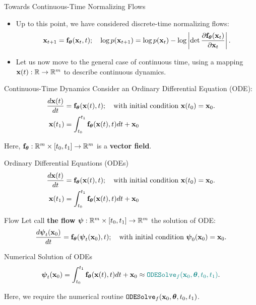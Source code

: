 \documentclass{beamer}
\renewcommand{\eqpause}{}
\renewcommand{\nextonslide}[1]{#1}
\begin{document}
\begin{frame}{Towards Continuous-Time Normalizing Flows}
	\begin{itemize}
		\item Up to this point, we have considered discrete-time normalizing flows:
		\vspace{-0.3cm}
		 \[
		 	 \mathbf{x}_{t+1} = \mathbf{f}_{\boldsymbol{\theta}}(\mathbf{x}_t, t); \quad \log p(\mathbf{x}_{t+1}) = \log p(\mathbf{x}_{t}) - \log \left| \det \frac{\partial \mathbf{f}_{\boldsymbol{\theta}}(\mathbf{x}_t)}{\partial \mathbf{x}_{t}} \right| .
		 \]
		\item Let us now move to the general case of continuous time, using a mapping $\mathbf{x}(t): \mathbb{R} \rightarrow \mathbb{R}^m$ to describe continuous dynamics.
	\end{itemize}
	\eqpause
	\begin{block}{Continuous-Time Dynamics}
		Consider an Ordinary Differential Equation (ODE):
		\vspace{-0.3cm}
		\begin{align*}
		   \frac{d \bx(t)}{dt} &= \bff_{\btheta}(\bx(t), t); \quad \text{with initial condition }\bx(t_0) = \bx_0. \\
		   \nextonslide{
		   \bx(t_1) &= \int^{t_1}_{t_0} \bff_{\btheta}(\bx(t), t) d t  + \bx_0
		   }
		\end{align*}
		\vspace{-0.6cm}
	\end{block}
	Here, $\mathbf{f}_{\boldsymbol{\theta}}: \mathbb{R}^m \times [t_0, t_1] \rightarrow \mathbb{R}^m$ is a \textbf{vector field}.
\end{frame}
\begin{frame}{Ordinary Differential Equations (ODEs)}
	\begin{align*}
		\frac{d \mathbf{x}(t)}{dt} &= \mathbf{f}_{\boldsymbol{\theta}}(\mathbf{x}(t), t); \quad \text{with initial condition }\mathbf{x}(t_0) = \mathbf{x}_0. \\
		\mathbf{x}(t_1) &= \int^{t_1}_{t_0} \mathbf{f}_{\boldsymbol{\theta}}(\mathbf{x}(t), t) d t  + \mathbf{x}_0
	\end{align*}
	\vspace{-0.6cm}
	\begin{block}{Flow}
		Let call \textbf{the flow} $\boldsymbol{\psi}: \mathbb{R}^m \times [t_0, t_1] \rightarrow \mathbb{R}^m$ the solution of ODE:
		\[
			\frac{d \boldsymbol{\psi}_t(\mathbf{x}_0)}{dt} = \mathbf{f}_{\boldsymbol{\theta}}(\boldsymbol{\psi}_t(\mathbf{x}_0), t); \quad \text{with initial condition }\boldsymbol{\psi}_0(\mathbf{x}_0) = \mathbf{x}_0.
		\]
	\end{block}
	\begin{block}{Numerical Solution of ODEs}
		\vspace{-0.5cm}
		\[
			\bpsi_t(\bx_0) = \int^{t_1}_{t_0} \bff_{\btheta}(\bx(t), t) d t  + \bx_0 \nextonslide{\approx {\color{teal}\texttt{ODESolve}_f(\bx_0, \btheta, t_0, t_1)}.}
		\]
		\eqpause
		Here, we require the numerical routine $\texttt{ODESolve}_f(\mathbf{x}_0, \boldsymbol{\theta}, t_0, t_1)$.
	\end{block}
\end{frame}
\end{document}
